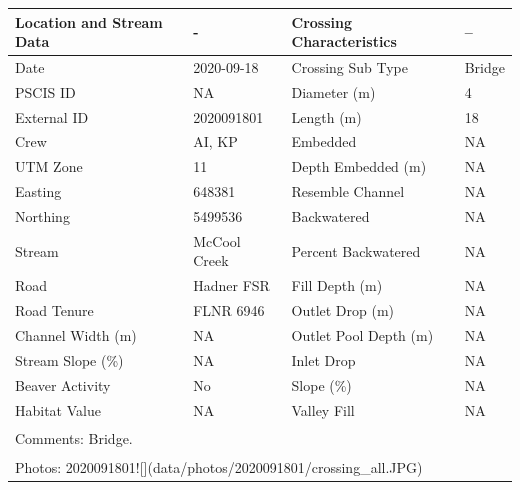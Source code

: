 \documentclass[
]{book}
\begin{document}
\begin{tabular}{llll}
\toprule
Location and Stream Data & - & Crossing Characteristics & --\\
\midrule
Date & 2020-09-18 & Crossing Sub Type & Bridge\\
PSCIS ID & NA & Diameter (m) & 4\\
External ID & 2020091801 & Length (m) & 18\\
Crew & AI, KP & Embedded & NA\\
UTM Zone & 11 & Depth Embedded (m) & NA\\
\addlinespace
Easting & 648381 & Resemble Channel & NA\\
Northing & 5499536 & Backwatered & NA\\
Stream & McCool Creek & Percent Backwatered & NA\\
Road & Hadner FSR & Fill Depth (m) & NA\\
Road Tenure & FLNR 6946 & Outlet Drop (m) & NA\\
\addlinespace
Channel Width (m) & NA & Outlet Pool Depth (m) & NA\\
Stream Slope (\%) & NA & Inlet Drop & NA\\
Beaver Activity & No & Slope (\%) & NA\\
Habitat Value & NA & Valley Fill & NA\\
\bottomrule
\multicolumn{4}{l}{\textsuperscript{} Comments: Bridge.}\\
\multicolumn{4}{l}{\textsuperscript{} Photos: 2020091801![](data/photos/2020091801/crossing\_all.JPG)}\\
\end{tabular}
\end{document}
